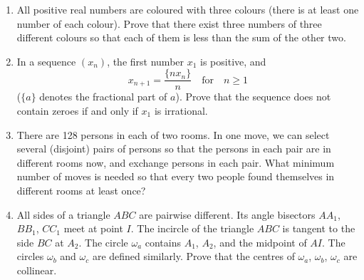\documentclass[12pt]{scrartcl}
\begin{document}
\begin{enumerate}[resume]
    \item All positive real numbers are coloured with three colours (there is at least one number of each colour). Prove that there exist three numbers of three different colours so that each of them is less than the sum of the other two. 

    \item In a sequence $(x_n)$, the first number $x_1$ is positive, and
    \[ x_{n+1} = \frac{\{nx_n\}}{n} \quad \text{for} \quad n \geqslant 1 \]
    ($\{a\}$ denotes the fractional part of $a$). Prove that the sequence does not contain zeroes if and only if $x_1$ is irrational. 

    \item There are 128 persons in each of two rooms. In one move, we can select several (disjoint) pairs of persons so that the persons in each pair are in different rooms now, and exchange persons in each pair. What minimum number of moves is needed so that every two people found themselves in different rooms at least once? 

    \item All sides of a triangle $ABC$ are pairwise different. Its angle bisectors $AA_1$, $BB_1$, $CC_1$ meet at point $I$. The incircle of the triangle $ABC$ is tangent to the side $BC$ at $A_2$. The circle $\omega_a$ contains $A_1$, $A_2$, and the midpoint of $AI$. The circles $\omega_b$ and $\omega_c$ are defined similarly. Prove that the centres of $\omega_a$, $\omega_b$, $\omega_c$ are collinear. 
\end{enumerate}
\end{document}
